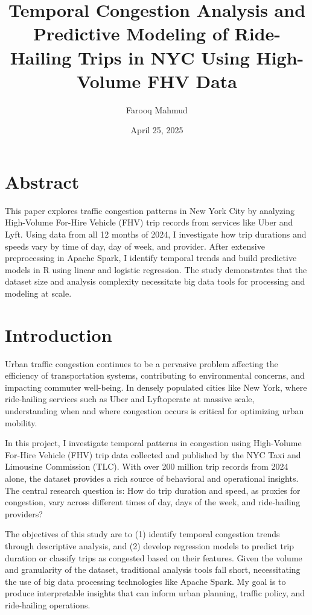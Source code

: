 \documentclass{article}
\title{\vspace{-2cm}Temporal Congestion Analysis and Predictive Modeling of Ride-Hailing Trips in NYC Using High-Volume FHV Data}
\author{Farooq Mahmud}
\date{April 25, 2025}
\begin{document}
\maketitle

\section{Abstract}
This paper explores traffic congestion patterns in New York City by analyzing High-Volume For-Hire Vehicle (FHV) trip records from services like Uber and Lyft. Using data from all 12 months of 2024, I investigate how trip durations and speeds vary by time of day, day of week, and provider. After extensive preprocessing in Apache Spark, I identify temporal trends and build predictive models in R using linear and logistic regression. The study demonstrates that the dataset size and analysis complexity necessitate big data tools for processing and modeling at scale.


\section{Introduction}
Urban traffic congestion continues to be a pervasive problem affecting the efficiency of transportation systems, contributing to environmental concerns, and impacting commuter well-being. In densely populated cities like New York, where ride-hailing services such as Uber and Lyftoperate at massive scale, understanding when and where congestion occurs is critical for optimizing urban mobility.

In this project, I investigate temporal patterns in congestion using High-Volume For-Hire Vehicle (FHV) trip data collected and published by the NYC Taxi and Limousine Commission (TLC). With over 200 million trip records from 2024 alone, the dataset provides a rich source of behavioral and operational insights. The central research question is: How do trip duration and speed, as proxies for congestion, vary across different times of day, days of the week, and ride-hailing providers?

The objectives of this study are to (1) identify temporal congestion trends through descriptive analysis, and (2) develop regression models to predict trip duration or classify trips as congested based on their features. Given the volume and granularity of the dataset, traditional analysis tools fall short, necessitating the use of big data processing technologies like Apache Spark. My goal is to produce interpretable insights that can inform urban planning, traffic policy, and ride-hailing operations.
\end{document}
